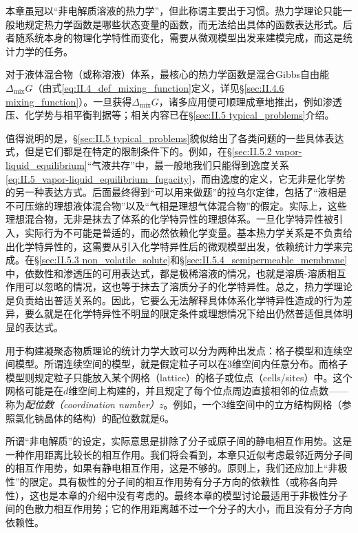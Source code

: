 \documentclass[main.tex]{subfiles}
\begin{document}
本章虽冠以“非电解质溶液的热力学”，但此称谓主要出于习惯。热力学理论只能一般地规定热力学函数是哪些状态变量的函数，而无法给出具体的函数表达形式。后者随系统本身的物理化学特性而变化，需要从微观模型出发来建模完成，而这是统计力学的任务。

对于液体混合物（或称溶液）体系，最核心的热力学函数是混合Gibbs自由能$\Delta_\text{mix} G$（由式\eqref{eq:II.4_def_mixing_function}定义，详见\S\ref{sec:II.4.6 mixing_function}）。一旦获得$\Delta_\text{mix} G$，诸多应用便可顺理成章地推出，例如渗透压、化学势与相平衡判据等；相关内容已在\S\ref{sec:II.5 typical_problems}介绍。

值得说明的是，\S\ref{sec:II.5 typical_problems}貌似给出了各类问题的一些具体表达式，但是它们都是在特定的限制条件下的。例如，在\S\ref{sec:II.5.2 vapor-liquid_equilibrium}“气液共存”中，最一般地我们只能得到逸度关系\eqref{eq:II.5_vapor-liquid_equilibrium_fugacity}，而由逸度的定义，它无非是化学势的另一种表达方式。后面最终得到“可以用来做题”的拉乌尔定律，包括了“液相是不可压缩的理想液体混合物”以及“气相是理想气体混合物”的假定。实际上，这些理想混合物，无非是抹去了体系的化学特异性的理想体系。一旦化学特异性被引入，实际行为不可能是普适的，而必然依赖化学变量。基本热力学关系是不负责给出化学特异性的，这需要从引入化学特异性后的微观模型出发，依赖统计力学来完成。在\S\ref{sec:II.5.3 non_volatile_solute}和\S\ref{sec:II.5.4_semipermeable_membrane}中，依数性和渗透压的可用表达式，都是极稀溶液的情况，也就是溶质-溶质相互作用可以忽略的情况，这也等于抹去了溶质分子的化学特异性。总之，热力学理论是负责给出普适关系的。因此，它要么无法解释具体体系化学特异性造成的行为差异，要么就是在化学特异性不明显的限定条件或理想情况下给出仍然普适但具体明显的表达式。

用于构建凝聚态物质理论的统计力学大致可以分为两种出发点：格子模型和连续空间模型。所谓连续空间的模型，就是假定粒子可以在3维空间内任意分布。而格子模型则规定粒子只能放入某个网格（lattice）的格子或位点（cells/sites）中。这个网格可能是在$d$维空间上构建的，并且规定了每个位点周边直接相邻的位点数——称为\emph{配位数（coordination number）}$z$。例如，一个3维空间中的立方结构网格（参照氯化钠晶体的结构）的配位数就是6。

所谓“非电解质”的设定，实际意思是排除了分子或原子间的静电相互作用势。这是一种作用距离比较长的相互作用。我们将会看到，本章只近似考虑最邻近两分子间的相互作用势，如果有静电相互作用，这是不够的。原则上，我们还应加上“非极性”的限定。具有极性的分子间的相互作用势有分子方向的依赖性（或称各向异性），这也是本章的介绍中没有考虑的。最终本章的模型讨论最适用于非极性分子间的色散力相互作用势；它的作用距离越不过一个分子的大小，而且没有分子方向依赖性。
\end{document}
